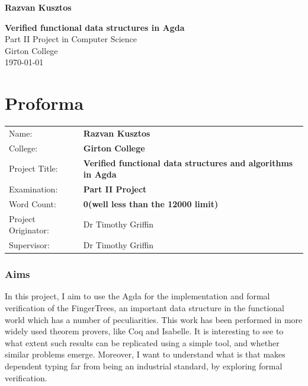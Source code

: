 \documentclass[12pt,twoside,notitlepage]{report}
\begin{document}





\pagestyle{empty}

\hfill{\LARGE \bf Razvan Kusztos}

\vspace*{60mm}
\begin{center}
\Huge
{\bf Verified functional data structures in Agda} \\
\vspace*{5mm}
Part II Project in Computer Science\\
\vspace*{5mm}
Girton College \\
\vspace*{5mm}
\today  %
\end{center}

\cleardoublepage


\linespread{1.5}



\setcounter{page}{1}
\pagestyle{plain}

\chapter*{Proforma}

{\large
\begin{tabular}{ll}
Name:               & \bf Razvan Kusztos                       \\
College:            & \bf Girton College                     \\
Project Title:      & \bf Verified functional data structures and algorithms in Agda \\
Examination:        & \bf Part II Project        \\
Word Count:         & \bf 0\footnotemark[1]
(well less than the 12000 limit) \\
Project Originator: & Dr Timothy Griffin                    \\
Supervisor:         & Dr Timothy Griffin                    \\
\end{tabular}
}

\subsection*{Aims}
In this project, I aim to use the Agda for the implementation and formal verification of the FingerTrees, an important data structure in the functional world which has a number of peculiarities. This work has been performed in more widely used theorem provers, like Coq and Isabelle. It is interesting to see to what extent such results can be replicated using a simple tool, and whether similar problems emerge.
Moreover, I want to understand what is that makes dependent typing far from being an industrial standard, by exploring formal verification.
\end{document}
